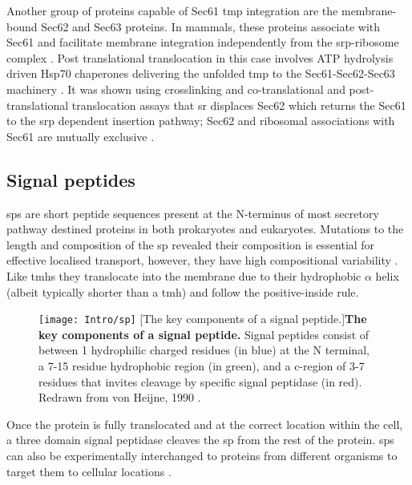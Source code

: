Another group of proteins capable of Sec61 \gls{tmp} integration are the membrane\--bound Sec62 and Sec63 proteins.
In mammals, these proteins associate with Sec61 and facilitate membrane integration independently from the \gls{srp}\--ribosome complex \cite{Meyer2000}.
Post translational translocation in this case involves ATP hydrolysis driven Hsp70 chaperones delivering the unfolded \gls{tmp} \cite{Chirico1988, Deshaies1988} to the Sec61\--Sec62\--Sec63 machinery \cite{Steel2004}.
It was shown using crosslinking and co\--translational and post\--translational translocation assays that \gls{sr} displaces Sec62 which returns the Sec61 to the \gls{srp} dependent insertion pathway; Sec62 and ribosomal associations with Sec61 are mutually exclusive \cite{Jadhav2015}.

\subsection{Signal peptides}
\gls{sp}s are short peptide sequences present at the N-terminus of most secretory pathway destined proteins in both prokaryotes and eukaryotes.
Mutations to the length and composition of the \gls{sp} revealed their composition is essential for effective localised transport, however, they have high compositional variability \cite{VonHeijne1985}.
Like \gls{tmh}s they translocate into the membrane due to their hydrophobic $\alpha$ helix (albeit typically shorter than a \gls{tmh}) and follow the positive\--inside rule.

\begin{figure}[ht]
\centering
\texttt{[image: Intro/sp]}
		[The key components of a signal peptide.]{\textbf{The key components of a signal peptide.}
		Signal peptides consist of between 1 hydrophilic charged residues (in blue) at the N terminal, a 7-15 residue hydrophobic region (in green), and a c-region of 3-7 residues that invites cleavage by specific signal peptidase (in red).
	Redrawn from von Heijne, 1990 \cite{VonHeijne1990}.
		}
\label{fig:sp}
\end{figure}

Once the protein is fully translocated and at the correct location within the cell, a three domain signal peptidase cleaves the \gls{sp} from the rest of the protein.
\gls{sp}s can also be experimentally interchanged to proteins from different organisms to target them to cellular locations \cite{Izard1994, Gierasch1989}.

